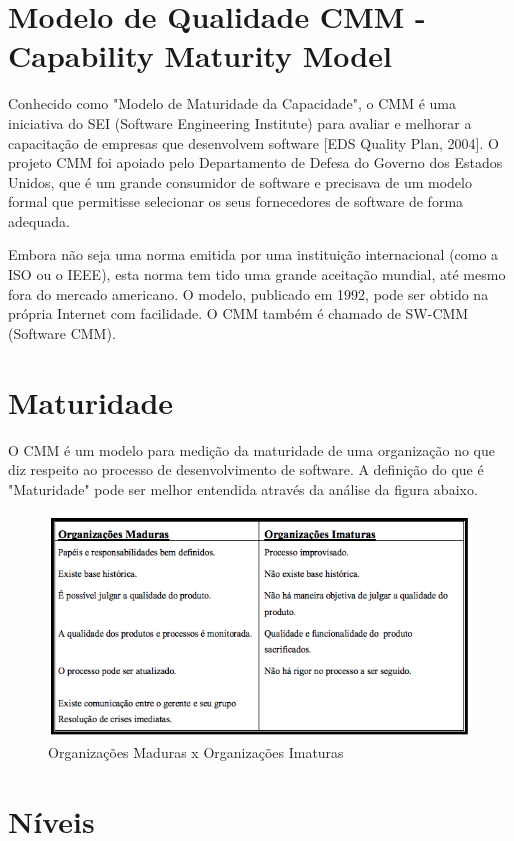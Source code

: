 \section{Modelo de Qualidade CMM - Capability Maturity Model }
\label{cmm}

Conhecido como "Modelo de Maturidade da Capacidade", o CMM é uma iniciativa
do SEI (Software Engineering Institute) para avaliar e melhorar a capacitação de empresas
que desenvolvem software [EDS Quality Plan, 2004]. O projeto CMM foi apoiado pelo
Departamento de Defesa do Governo dos Estados Unidos, que é um grande consumidor de
software e precisava de um modelo formal que permitisse selecionar os seus fornecedores
de software de forma adequada.

Embora não seja uma norma emitida por uma instituição internacional (como a ISO
ou o IEEE), esta norma tem tido uma grande aceitação mundial, até mesmo fora do
mercado americano. O modelo, publicado em 1992, pode ser obtido na própria Internet com
facilidade. O CMM também é chamado de SW-CMM (Software CMM).

\section{Maturidade}

O CMM é um modelo para medição da maturidade de uma organização no que diz
respeito ao processo de desenvolvimento de software. A definição do que é "Maturidade"
pode ser melhor entendida através da análise da figura abaixo.

\begin{figure}[H]
    \centering
    \includegraphics[width=0.7\linewidth]{dados/figuras/maturidade}
    \caption{Organizações Maduras x Organizações Imaturas}
    \label{fig:qualidade}
\end{figure}

\section{Níveis}

